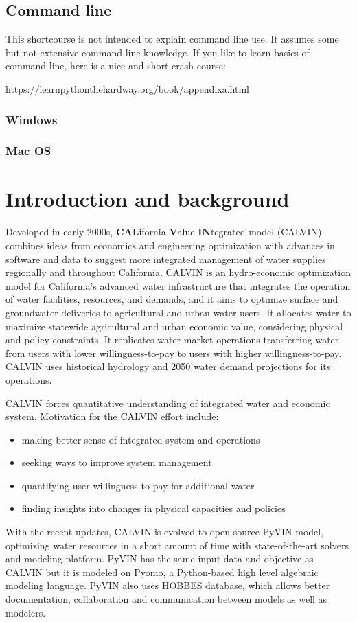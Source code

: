 \documentclass[12pt]{article}%
\begin{document}
\subsection{Command line}
%
This shortcourse is not intended to explain command line use. It assumes some but not extensive command line knowledge. If you like to learn basics of command line, here is a nice and short crash course:
%
\par https://learnpythonthehardway.org/book/appendixa.html
%
\subsubsection{Windows}
%
\subsubsection{Mac OS}
%
\pagebreak
%
\section{Introduction and background}
%
Developed in early 2000s, {\bf CAL}ifornia {\bf V}alue {\bf IN}tegrated model (CALVIN) combines ideas from economics and engineering optimization with advances in software and data to suggest more integrated management of water supplies regionally and throughout California. CALVIN is an hydro-economic optimization model for California's advanced water infrastructure that integrates the operation of water facilities, resources, and demands, and it aims to optimize surface and groundwater deliveries to agricultural and urban water users. It allocates water to maximize statewide agricultural and urban economic value, considering physical and policy constraints. It replicates water market operations transferring water from users with lower willingness-to-pay to users with higher willingness-to-pay. CALVIN uses historical hydrology and 2050 water demand projections for its operations. \\
\par CALVIN forces quantitative understanding of integrated water and economic system. Motivation for the CALVIN effort include:
\begin{itemize}
	\item making better sense of integrated system and operations
	\item seeking ways to improve system management
	\item quantifying user willingness to pay for additional water
	\item finding insights into changes in physical capacities and policies
\end{itemize}
%
\par With the recent updates, CALVIN is evolved to open-source PyVIN model, optimizing water resources in a short amount of time with state-of-the-art solvers and modeling platform. PyVIN has the same input data and objective as CALVIN but it is modeled on Pyomo, a Python-based high level algebraic modeling language. PyVIN also uses HOBBES database, which allows better documentation, collaboration and communication between models as well as modelers.
%
\end{document}
